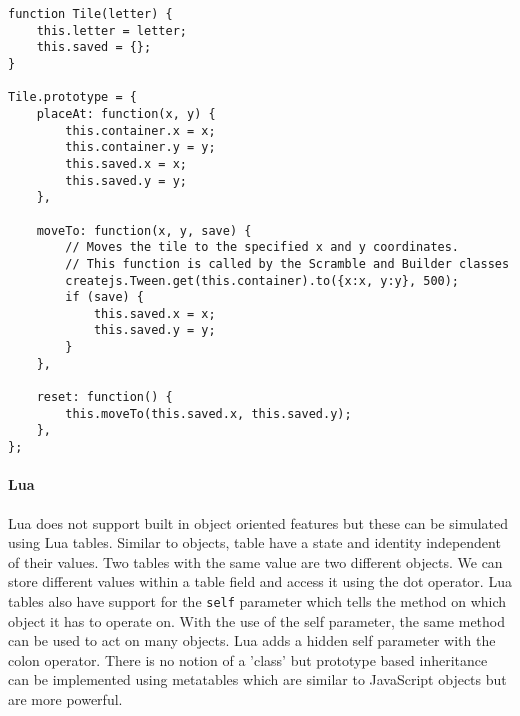 \begin{lstlisting}[caption=A class definition in JavaScript.]
function Tile(letter) {
	this.letter = letter;
	this.saved = {};
}

Tile.prototype = {
	placeAt: function(x, y) {
		this.container.x = x;
		this.container.y = y;
		this.saved.x = x;
		this.saved.y = y;
	},

	moveTo: function(x, y, save) {
		// Moves the tile to the specified x and y coordinates.
		// This function is called by the Scramble and Builder classes
		createjs.Tween.get(this.container).to({x:x, y:y}, 500);
		if (save) {
			this.saved.x = x;
			this.saved.y = y;
		}
	},

	reset: function() {
		this.moveTo(this.saved.x, this.saved.y);
	},
};
\end{lstlisting}

\paragraph{Lua}
Lua does not support built in object oriented features but these can be simulated using Lua tables. Similar to objects, table have a state and identity independent of their values. Two tables with the same value are two different objects. We can store different values within a table field and access it using the dot operator. Lua tables also have support for the \texttt{self} parameter which tells the method on which object it has to operate on. With the use of the self parameter, the same method can be used to act on many objects. Lua adds a hidden self parameter with the colon operator. There is no notion of a 'class' but prototype based inheritance can be implemented using metatables which are similar to JavaScript objects but are more powerful. 
